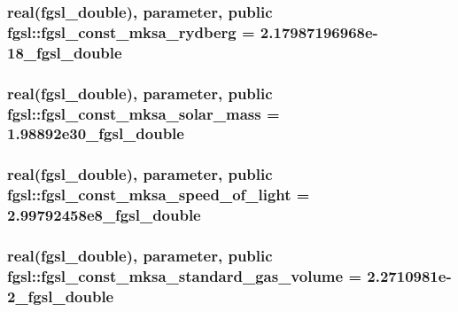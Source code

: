 \hypertarget{classfgsl_a06f564b1101469e9756b3bb20be06b16}{
\subsubsection[{fgsl\-\_\-const\-\_\-mksa\-\_\-rydberg}]{\setlength{\rightskip}{0pt plus 5cm}real({\bf fgsl\-\_\-double}), parameter, public fgsl\-::fgsl\-\_\-const\-\_\-mksa\-\_\-rydberg = 2.\-17987196968e-\/18\-\_\-fgsl\-\_\-double}}\label{classfgsl_a06f564b1101469e9756b3bb20be06b16}
\hypertarget{classfgsl_accd84d0687faa8d8009cb69525c2c81d}{
\subsubsection[{fgsl\-\_\-const\-\_\-mksa\-\_\-solar\-\_\-mass}]{\setlength{\rightskip}{0pt plus 5cm}real({\bf fgsl\-\_\-double}), parameter, public fgsl\-::fgsl\-\_\-const\-\_\-mksa\-\_\-solar\-\_\-mass = 1.\-98892e30\-\_\-fgsl\-\_\-double}}\label{classfgsl_accd84d0687faa8d8009cb69525c2c81d}
\hypertarget{classfgsl_a3d8ceae8504f8bd508cbd8865e1ba1b8}{
\subsubsection[{fgsl\-\_\-const\-\_\-mksa\-\_\-speed\-\_\-of\-\_\-light}]{\setlength{\rightskip}{0pt plus 5cm}real({\bf fgsl\-\_\-double}), parameter, public fgsl\-::fgsl\-\_\-const\-\_\-mksa\-\_\-speed\-\_\-of\-\_\-light = 2.\-99792458e8\-\_\-fgsl\-\_\-double}}\label{classfgsl_a3d8ceae8504f8bd508cbd8865e1ba1b8}
\hypertarget{classfgsl_a43547e219346197d5b5b8c6adff614eb}{
\subsubsection[{fgsl\-\_\-const\-\_\-mksa\-\_\-standard\-\_\-gas\-\_\-volume}]{\setlength{\rightskip}{0pt plus 5cm}real({\bf fgsl\-\_\-double}), parameter, public fgsl\-::fgsl\-\_\-const\-\_\-mksa\-\_\-standard\-\_\-gas\-\_\-volume = 2.\-2710981e-\/2\-\_\-fgsl\-\_\-double}}\label{classfgsl_a43547e219346197d5b5b8c6adff614eb}
